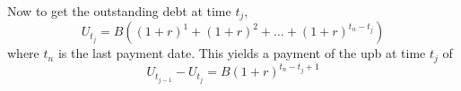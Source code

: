     Now to get the outstanding debt at time $t_j$, 
    \begin{equation}
        U_{t_j} = B \left(
            (1+r)^1 + (1 + r)^2 + \ldots + (1 + r)^{t_n - t_j}
            \right)
    \end{equation}
    where $t_n$ is the last payment date. This yields a payment of the 
    upb at time $t_j$ of
    \begin{equation}
        U_{t_{j-1}} - U_{t_{j}} = 
        B (1 + r)^{t_n - t_j + 1}  
    \end{equation}